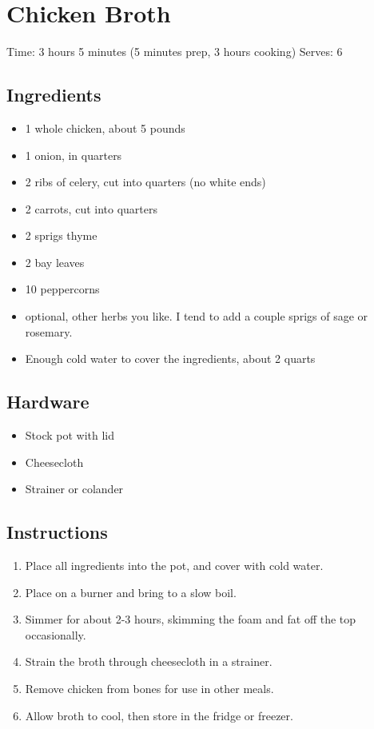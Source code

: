 \section{Chicken Broth}
\label{chickenBroth}
\setcounter{secnumdepth}{0}
Time: 3 hours 5 minutes (5 minutes prep, 3 hours cooking)
Serves: 6

\begin{multicols}{2}
\subsection*{Ingredients}
\begin{itemize}
    \item 1 whole chicken, about 5 pounds
    \item 1 onion, in quarters
    \item 2 ribs of celery, cut into quarters (no white ends)
    \item 2 carrots, cut into quarters
    \item 2 sprigs thyme
    \item 2 bay leaves
    \item 10 peppercorns
    \item optional, other herbs you like. I tend to add a couple sprigs of sage or rosemary.
    \item Enough cold water to cover the ingredients, about 2 quarts
\end{itemize}

\subsection*{Hardware}
\begin{itemize}
    \item Stock pot with lid
    \item Cheesecloth
    \item Strainer or colander
\end{itemize}
\clearpage

\subsection*{Instructions}
\begin{enumerate}
    \item Place all ingredients into the pot, and cover with cold water.
    \item Place on a burner and bring to a slow boil.
    \item Simmer for about 2-3 hours, skimming the foam and fat off the top occasionally.
    \item Strain the broth through cheesecloth in a strainer.
    \item Remove chicken from bones for use in other meals.
    \item Allow broth to cool, then store in the fridge or freezer.
\end{enumerate}


\end{multicols}

